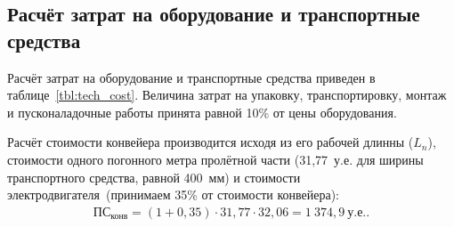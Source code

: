 \vspace{-5mm}

\subsection{Расчёт затрат на оборудование и транспортные средства}

Расчёт затрат на оборудование и транспортные средства
приведен в таблице~\ref{tbl:tech_cost}. Величина затрат на упаковку,
транспортировку, монтаж и пусконаладочные работы принята равной 10\%
от цены оборудования.

Расчёт стоимости конвейера производится исходя из его рабочей длинны ($ L_n $),
стоимости одного погонного метра пролётной части (31,77~у.е. для ширины
транспортного средства, равной 400~мм) и стоимости электродвигателя~(принимаем
35\% от стоимости конвейера):
\begin{align*}
  \text{ПС}_{\text{конв}} = (1 + 0{,}35) \cdot 31{,}77 \cdot 32{,}06 = 1~374{,}9~\text{у.е.}.
\end{align*}

